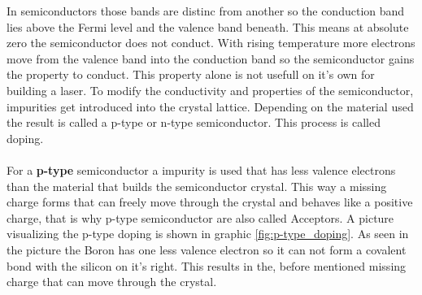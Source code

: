 In semiconductors those bands are distinc from another so the conduction band lies above the Fermi level and the valence band beneath.
This means at absolute zero the semiconductor does not conduct.
With rising temperature more electrons move from the valence band into the conduction band so the semiconductor gains the property to conduct.
This property alone is not usefull on it's own for building a laser.
To modify the conductivity and properties of the semiconductor, impurities get introduced into the crystal lattice.
Depending on the material used the result is called a p-type or n-type semiconductor.
This process is called doping.
\\\\
\FloatBarrier
For a \textbf{p-type} semiconductor a impurity is used that has less valence electrons than the material that builds the semiconductor crystal.
This way a missing charge forms that can freely move through the crystal and behaves like a positive charge, that is why p-type semiconductor are also called Acceptors.
A picture visualizing the p-type doping is shown in graphic \ref{fig:p-type_doping}.
As seen in the picture the Boron has one less valence electron so it can not form a covalent bond with the silicon on it's right.
This results in the, before mentioned missing charge that can move through the crystal.
